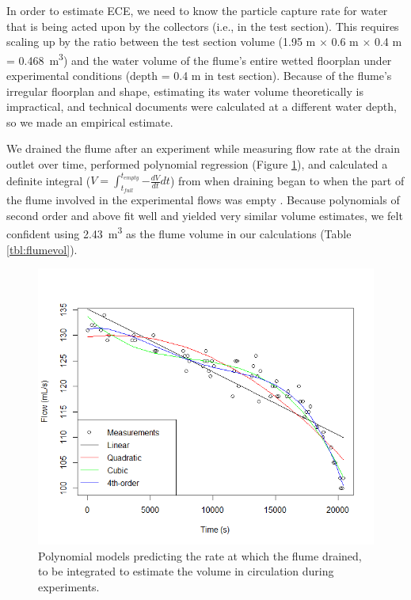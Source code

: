 \documentclass[geosciences,article,submit,moreauthors,pdftex]{Definitions/mdpi}
\begin{document}
In order to estimate ECE, we need to know the particle capture rate for water that is being acted upon by the collectors (i.e., in the test section). This requires scaling up by the ratio between the test section volume (1.95 m $\times$ 0.6 m $\times$ 0.4 m = \SI{0.468}{m^3}) and the water volume of the flume's entire wetted floorplan under experimental conditions (depth = 0.4 m in test section). Because of the flume's irregular floorplan and shape, estimating its water volume theoretically is impractical, and technical documents were calculated at a different water depth, so we made an empirical estimate. 

We drained the flume after an experiment while measuring flow rate at the drain outlet over time, performed polynomial regression (Figure \ref{fig:flumevol}), and calculated a definite integral ($V = \int_{t_{full}}^{t_{empty}}{-\frac{dV}{dt}dt}$) from when draining began to when the part of the flume involved in the experimental flows was empty . Because polynomials of second order and above fit well and yielded very similar volume estimates, we felt confident using \SI{2.43}{\metre\cubed} as the flume volume in our calculations (Table \ref{tbl:flumevol}).


\begin{figure}[H]
\centering
\includegraphics[width=4.7in]{../pics/flumevol.png}
\caption{Polynomial models predicting the rate at which the flume drained, to be integrated to estimate the volume in circulation during experiments.}
\label{fig:flumevol}
\end{figure}
\end{document}
